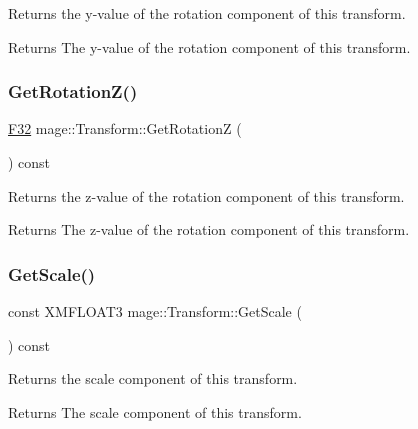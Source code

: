 Returns the y-\/value of the rotation component of this transform.

\begin{DoxyReturn}{Returns}
The y-\/value of the rotation component of this transform. 
\end{DoxyReturn}
\hypertarget{classmage_1_1_transform_a1c2ae96eb6c0d33afd406ca1685b74f5}{}\label{classmage_1_1_transform_a1c2ae96eb6c0d33afd406ca1685b74f5} 
\subsubsection{\texorpdfstring{Get\+Rotation\+Z()}{GetRotationZ()}}
{\footnotesize\ttfamily \hyperlink{namespacemage_aa97e833b45f06d60a0a9c4fc22ae02c0}{F32} mage\+::\+Transform\+::\+Get\+RotationZ (\begin{DoxyParamCaption}{ }\end{DoxyParamCaption}) const\hspace{0.3cm}{\ttfamily [noexcept]}}

Returns the z-\/value of the rotation component of this transform.

\begin{DoxyReturn}{Returns}
The z-\/value of the rotation component of this transform. 
\end{DoxyReturn}
\hypertarget{classmage_1_1_transform_a0f63b2450b9ecb066bf4e34707d9148e}{}\label{classmage_1_1_transform_a0f63b2450b9ecb066bf4e34707d9148e} 
\subsubsection{\texorpdfstring{Get\+Scale()}{GetScale()}}
{\footnotesize\ttfamily const X\+M\+F\+L\+O\+A\+T3 mage\+::\+Transform\+::\+Get\+Scale (\begin{DoxyParamCaption}{ }\end{DoxyParamCaption}) const\hspace{0.3cm}{\ttfamily [noexcept]}}

Returns the scale component of this transform.

\begin{DoxyReturn}{Returns}
The scale component of this transform. 
\end{DoxyReturn}
\hypertarget{classmage_1_1_transform_a86eff370d6cb37a7aa5f7d78d4cf3cf4}{}\label{classmage_1_1_transform_a86eff370d6cb37a7aa5f7d78d4cf3cf4} 
